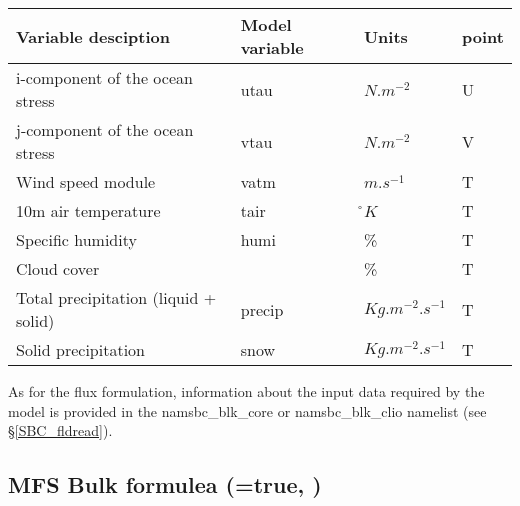 \documentclass[NEMO_book]{subfiles}
\begin{document}
\begin{table}[htbp]   \label{Tab_CLIO}
\begin{center}
\begin{tabular}{|l|l|l|l|}
\hline
Variable desciption				& Model variable	& Units				& point \\	\hline
i-component of the ocean stress		& utau			& $N.m^{-2}$			& U \\	\hline
j-component of the ocean stress		& vtau			& $N.m^{-2}$			& V \\	\hline
Wind speed module					& vatm			& $m.s^{-1}$			& T \\	\hline
10m air temperature					& tair			& \r{}$K$				& T \\	\hline
Specific humidity						& humi			& \%					& T \\	\hline
Cloud cover							& 				& \%					& T \\	\hline
Total precipitation (liquid + solid)	& precip		& $Kg.m^{-2}.s^{-1}$	& T \\	\hline
Solid precipitation 					& snow			& $Kg.m^{-2}.s^{-1}$	& T \\	\hline
\end{tabular}
\end{center}
\end{table}

As for the flux formulation, information about the input data required by the 
model is provided in the namsbc\_blk\_core or namsbc\_blk\_clio 
namelist (see \S\ref{SBC_fldread}). 

\subsection    [MFS Bulk formulea (\np{ln\_mfs}=true)]
		      {MFS Bulk formulea (=true, )}
\label{SBC_blk_mfs}
\end{document}
